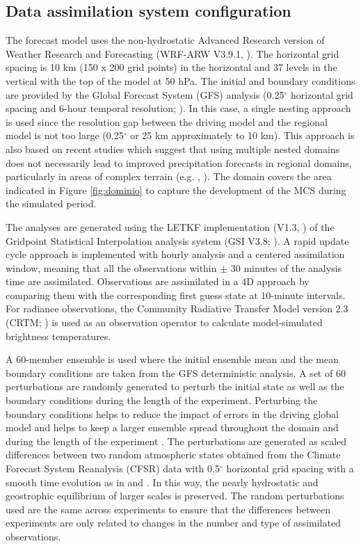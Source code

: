 \documentclass[final,5p,times,twocolumn,authoryear]{elsarticle} %
\begin{document}
\hypertarget{config}{%
\subsection{Data assimilation system configuration}\label{config}}

The forecast model uses the non-hydrostatic Advanced Research version of Weather Research and Forecasting (WRF-ARW V3.9.1, \citet{skamarock2008}).
The horizontal grid spacing is 10 km (150 x 200 grid points) in the horizontal and 37 levels in the vertical with the top of the model at 50 hPa.
The initial and boundary conditions are provided by the Global Forecast System (GFS) analysis (0.25\(^{\circ}\) horizontal grid spacing and 6-hour temporal resolution; \citet{cisl_rda_ds084.1}). In this case, a single nesting approach is used since the resolution gap between the driving model and the regional model is not too large (0.25\(^{\circ}\) or 25 km approximately to 10 km). This approach is also based on recent studies which suggest that using multiple nested domains does not necessarily lead to improved precipitation forecasts in regional domains, particularly in areas of complex terrain (e.g. \citet{liang2019}, \citet{beck2004}). The domain covers the area indicated in Figure \ref{fig:dominio} to capture the development of the MCS during the simulated period.

The analyses are generated using the LETKF implementation (V1.3, \citet{hunt2007}) of the Gridpoint Statistical Interpolation analysis system (GSI V3.8; \citet{shao2016}).
A rapid update cycle approach is implemented with hourly analysis and a centered assimilation window, meaning that all the observations within \(\pm\) 30 minutes of the analysis time are assimilated.
Observations are assimilated in a 4D approach by comparing them with the corresponding first guess state at 10-minute intervals.
For radiance observations, the Community Radiative Transfer Model version 2.3 (CRTM; \citet{han2006}) is used as an observation operator to calculate model-simulated brightness temperatures.

A 60-member ensemble is used where the initial ensemble mean and the mean boundary conditions are taken from the GFS deterministic analysis. A set of 60 perturbations are randomly generated to perturb the initial state as well as the boundary conditions during the length of the experiment. Perturbing the boundary conditions helps to reduce the impact of errors in the driving global model and helps to keep a larger ensemble spread throughout the domain and during the length of the experiment \citep{ouaraini2015}. The perturbations are generated as scaled differences between two random atmospheric states obtained from the Climate Forecast System Reanalysis (CFSR) data with 0.5\(^{\circ}\) horizontal grid spacing with a smooth time evolution as in \citet{necker2020} and \citet{maldonado2021}. In this way, the nearly hydrostatic and geostrophic equilibrium of larger scales is preserved. The random perturbations used are the same across experiments to ensure that the differences between experiments are only related to changes in the number and type of assimilated observations.
\end{document}
